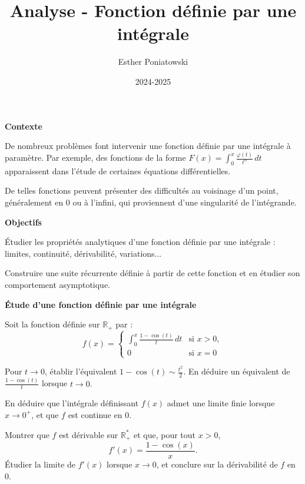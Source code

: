 \documentclass[10pt,a4paper]{article}
\title{Analyse - Fonction définie par une intégrale}
\author{Esther Poniatowski}
\date{2024-2025}
\begin{document}
\textbf{Contexte}

De nombreux problèmes font intervenir une fonction définie par une intégrale à paramètre. Par
exemple, des fonctions de la forme \( \displaystyle F(x) = \int_0^x \frac{\varphi(t)}{t^\alpha} \,
dt \) apparaissent dans l'étude de certaines équations différentielles.

De telles fonctions peuvent présenter des difficultés au voisinage d'un point, généralement en 0 ou
à l'infini, qui proviennent d'une singularité de l'intégrande.

\bigskip
\textbf{Objectifs}

Étudier les propriétés analytiques d'une fonction définie par une intégrale : limites, continuité,
dérivabilité, variations...

Construire une suite récurrente définie à partir de cette fonction et en étudier son comportement
asymptotique.

\bigskip

\textbf{Étude d'une fonction définie par une intégrale}

Soit la fonction définie sur \( \mathbb{R}_+ \) par :
\[
f(x) =
\begin{cases}
\displaystyle \int_0^x \frac{1 - \cos(t)}{t} \, dt & \text{si } x > 0, \\
0 & \text{si } x = 0
\end{cases}
\]

\q Pour \( t \to 0 \), établir l'équivalent \( 1 - \cos(t) \sim \frac{t^2}{2} \). En déduire un
équivalent de \( \frac{1 - \cos(t)}{t} \) lorsque \( t \to 0 \).

\q En déduire que l'intégrale définissant \( f(x) \) admet une limite finie lorsque \( x \to 0^+ \),
et que \( f \) est continue en \( 0 \).

\q Montrer que \( f \) est dérivable sur \( \mathbb{R}_+^* \) et que, pour tout \( x > 0 \),
\[
f'(x) = \frac{1 - \cos(x)}{x}.
\]
Étudier la limite de \( f'(x) \) lorsque \( x \to 0 \), et conclure sur la dérivabilité de \( f \)
en \( 0 \).
\end{document}

